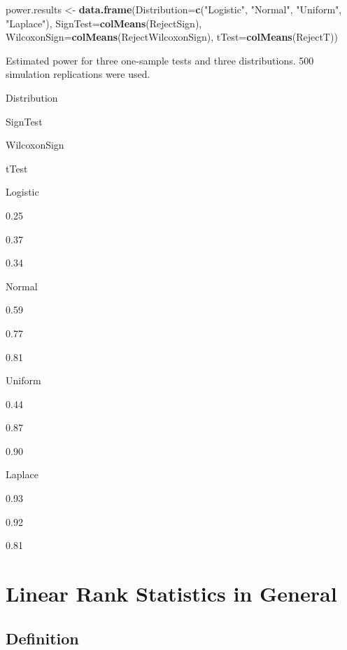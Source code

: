 \documentclass[]{book}
\newenvironment{Shaded}{\begin{snugshade}}{\end{snugshade}}
\newcommand{\DataTypeTok}[1]{\textcolor[rgb]{0.13,0.29,0.53}{#1}}
\newcommand{\KeywordTok}[1]{\textcolor[rgb]{0.13,0.29,0.53}{\textbf{#1}}}
\newcommand{\NormalTok}[1]{#1}
\newcommand{\StringTok}[1]{\textcolor[rgb]{0.31,0.60,0.02}{#1}}
\begin{document}
\begin{Shaded}
\begin{Highlighting}[]
\NormalTok{power.results <-}\StringTok{ }\KeywordTok{data.frame}\NormalTok{(}\DataTypeTok{Distribution=}\KeywordTok{c}\NormalTok{(}\StringTok{"Logistic"}\NormalTok{, }\StringTok{"Normal"}\NormalTok{, }\StringTok{"Uniform"}\NormalTok{, }\StringTok{"Laplace"}\NormalTok{),}
                 \DataTypeTok{SignTest=}\KeywordTok{colMeans}\NormalTok{(RejectSign), }\DataTypeTok{WilcoxonSign=}\KeywordTok{colMeans}\NormalTok{(RejectWilcoxonSign),}
                 \DataTypeTok{tTest=}\KeywordTok{colMeans}\NormalTok{(RejectT))}
\end{Highlighting}
\end{Shaded}

Estimated power for three one-sample tests and
three distributions. 500 simulation replications were used.

Distribution

SignTest

WilcoxonSign

tTest

Logistic

0.25

0.37

0.34

Normal

0.59

0.77

0.81

Uniform

0.44

0.87

0.90

Laplace

0.93

0.92

0.81

\hypertarget{linear-rank-statistics-in-general}{%
\section{Linear Rank Statistics in General}\label{linear-rank-statistics-in-general}}

\hypertarget{definition-1}{%
\subsection{Definition}\label{definition-1}}
\end{document}
